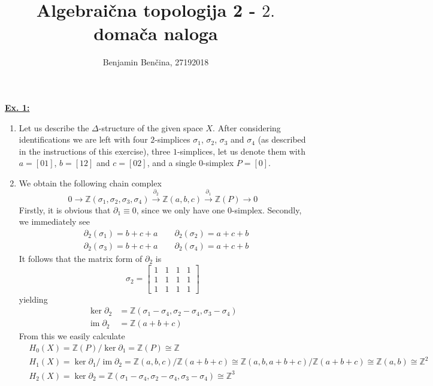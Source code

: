 \documentclass[a4paper, 12pt]{article}
\title{Algebraična topologija 2 - $2.$ domača naloga}
\author{Benjamin Benčina, 27192018}
\DeclareMathOperator{\im}{im}
\newcommand{\Z}{\mathbb{Z}}
\newcommand{\iso}{\cong}
\begin{document}
\maketitle

\underline{\textbf{Ex. 1:}}

\begin{enumerate}[label=(\alph*)]
	\item Let us describe the $\Delta$-structure of the given space $X$. After considering identifications we are left with four $2$-simplices $\sigma_1$, $\sigma_2$, $\sigma_3$ and $\sigma_4$ (as described in the instructions of this exercise), three $1$-simplices, let us denote them with $a = [01]$, $b = [12]$ and $c = [02]$, and a single $0$-simplex $P = [0]$.
	
	\item We obtain the following chain complex
	\[
	0 \xrightarrow{} \Z(\sigma_1, \sigma_2, \sigma_3, \sigma_4) \xrightarrow{\partial_2} \Z(a, b, c) \xrightarrow{\partial_1} \Z(P) \xrightarrow{} 0
	\]
	Firstly, it is obvious that $\partial_1 \equiv 0$, since we only have one $0$-simplex. Secondly, we immediately see
	\begin{align*}
	 &\partial_2(\sigma_1) = b + c + a \quad\quad \partial_2(\sigma_2) = a + c + b \\
	 &\partial_2(\sigma_3) = b + c + a \quad\quad \partial_2(\sigma_4) = a + c + b
	\end{align*}
	It follows that the matrix form of $\partial_2$ is
	\[
	\sigma_2 =
	\begin{bmatrix}
	1 & 1 & 1 & 1\\
	1 & 1 & 1 & 1\\
	1 & 1 & 1 & 1
	\end{bmatrix}
	\]
	yielding
	\begin{align*}
	\ker\partial_2 &= \Z(\sigma_1 - \sigma_4, \sigma_2 - \sigma_4, \sigma_3 - \sigma_4)\\
	\im\partial_2 &= \Z(a + b + c)
	\end{align*}
	From this we easily calculate
	\begin{align*}
	&H_0(X) = \Z(P) / \ker\partial_1 = \Z(P) \iso \Z \\
	&H_1(X) = \ker\partial_1 / \im\partial_2 = \Z(a, b, c) / \Z(a + b + c) \iso \Z(a, b, a+ b+ c) / \Z(a+b+c) \iso \Z(a, b)  \iso \Z^2 \\
	&H_2(X) = \ker\partial_2 = \Z(\sigma_1 - \sigma_4, \sigma_2 - \sigma_4, \sigma_3 - \sigma_4) \iso \Z^3
	\end{align*}
	

\end{enumerate}
\end{document}
